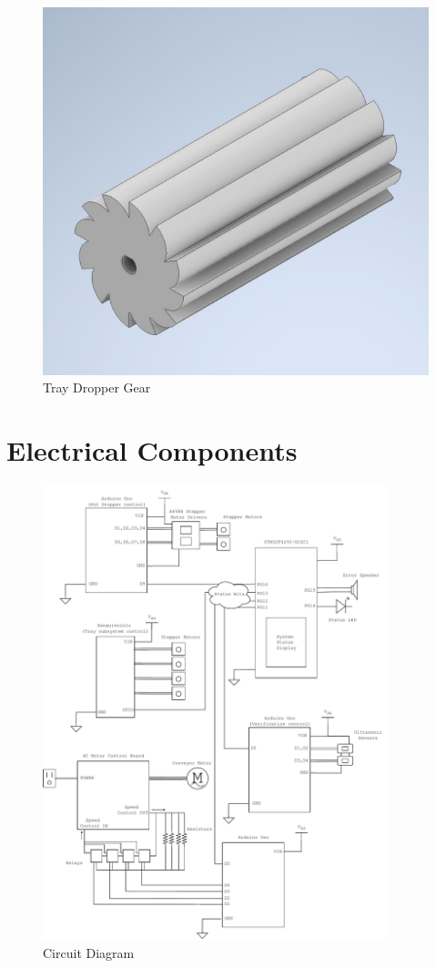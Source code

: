 \documentclass[12pt, titlepage]{article}
\begin{document}
\begin{figure}[H]
  \centering
  \includegraphics{Tray_Dropper_Gear.jpg}
  \caption{Tray Dropper Gear}
  \label{fig:traydropper2}
\end{figure}

\section{Electrical Components}

\begin{figure}[H]
  \centering
  \includegraphics[width=0.89\textwidth]{circuit_diagram.pdf}
  \caption{Circuit Diagram}
  \label{fig:circuit}
\end{figure}
\end{document}
